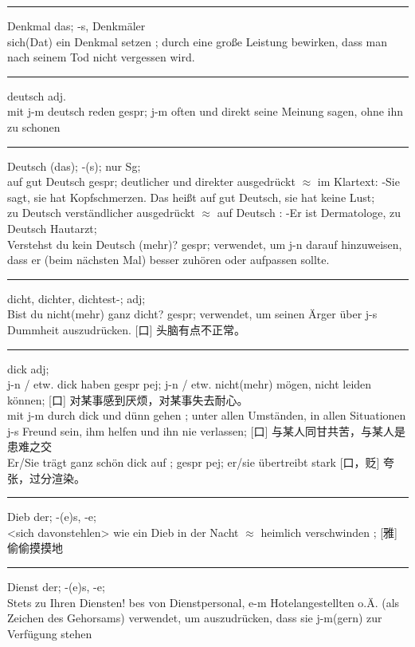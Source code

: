 \noindent\rule{\textwidth}{1pt}
Denkmal das; -s, Denkm\"aler \\
sich(Dat) ein Denkmal setzen ; durch eine gro\ss{}e Leistung bewirken, dass man nach seinem Tod nicht vergessen wird. \\

\noindent\rule{\textwidth}{1pt}
deutsch adj. \\
mit j-m deutsch reden gespr; j-m often und direkt seine Meinung sagen, ohne ihn zu schonen \\

\noindent\rule{\textwidth}{1pt}
Deutsch (das); -(s); nur Sg; \\
auf gut Deutsch gespr; deutlicher und direkter ausgedr\"uckt $\approx$ im Klartext: -Sie sagt, sie hat Kopfschmerzen. Das hei\ss{}t auf gut Deutsch, sie hat keine Lust;\\
zu Deutsch verst\"andlicher ausgedr\"uckt $\approx$ auf Deutsch : -Er ist Dermatologe, zu Deutsch Hautarzt;\\
Verstehst du kein Deutsch (mehr)? gespr; verwendet, um j-n darauf hinzuweisen, dass er (beim n\"achsten Mal) besser zuh\"oren oder aufpassen sollte.\\

\noindent\rule{\textwidth}{1pt}
dicht, dichter, dichtest-; adj; \\
Bist du nicht(mehr) ganz dicht? gespr; verwendet, um seinen \"Arger \"uber j-s Dummheit auszudr\"ucken. [口] 头脑有点不正常。\\

\noindent\rule{\textwidth}{1pt}
dick adj; \\
j-n / etw. dick haben gespr pej; j-n / etw. nicht(mehr) m\"ogen, nicht leiden k\"onnen; [口] 对某事感到厌烦，对某事失去耐心。\\
mit j-m durch dick und d\"unn gehen ; unter allen Umst\"anden, in allen Situationen j-s Freund sein, ihm helfen und ihn nie verlassen; [口] 与某人同甘共苦，与某人是患难之交\\
Er/Sie tr\"agt ganz sch\"on dick auf ; gespr pej; er/sie \"ubertreibt stark [口，贬] 夸张，过分渲染。\\

\noindent\rule{\textwidth}{1pt}
Dieb der; -(e)s, -e; \\
<sich davonstehlen> wie ein Dieb in der Nacht $\approx$  heimlich verschwinden ; [雅] 偷偷摸摸地 \\

\noindent\rule{\textwidth}{1pt}
Dienst der; -(e)s, -e; \\
Stets zu Ihren Diensten! bes von Dienstpersonal, e-m Hotelangestellten o.\"A. (als Zeichen des Gehorsams) verwendet, um auszudr\"ucken, dass sie j-m(gern) zur Verf\"ugung stehen \\


